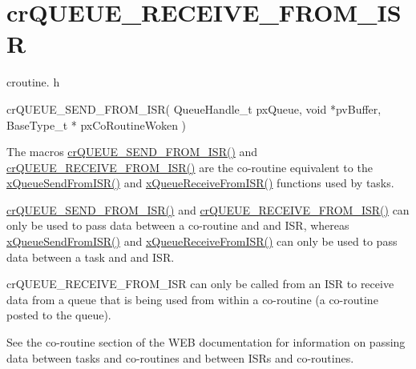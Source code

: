 \hypertarget{group__cr_q_u_e_u_e___r_e_c_e_i_v_e___f_r_o_m___i_s_r}{}\section{cr\+Q\+U\+E\+U\+E\+\_\+\+R\+E\+C\+E\+I\+V\+E\+\_\+\+F\+R\+O\+M\+\_\+\+I\+SR}
\label{group__cr_q_u_e_u_e___r_e_c_e_i_v_e___f_r_o_m___i_s_r}
croutine. h 
\begin{DoxyPre}
 crQUEUE\_SEND\_FROM\_ISR(
                           QueueHandle\_t pxQueue,
                           void *pvBuffer,
                           BaseType\_t * pxCoRoutineWoken
                      )\end{DoxyPre}


The macro\textquotesingle{}s \mbox{\hyperlink{croutine_8h_ac8eb0a81c5cf69de7e4edd73ce44a3be}{cr\+Q\+U\+E\+U\+E\+\_\+\+S\+E\+N\+D\+\_\+\+F\+R\+O\+M\+\_\+\+I\+S\+R()}} and \mbox{\hyperlink{croutine_8h_a9c0fa977ca69adbddb4811affa2a71f7}{cr\+Q\+U\+E\+U\+E\+\_\+\+R\+E\+C\+E\+I\+V\+E\+\_\+\+F\+R\+O\+M\+\_\+\+I\+S\+R()}} are the co-\/routine equivalent to the \mbox{\hyperlink{queue_8h_a21d5919ed26c21d121df4a4debeb643c}{x\+Queue\+Send\+From\+I\+S\+R()}} and \mbox{\hyperlink{queue_8h_acdf528f5c91131ae2f31c669cfd65758}{x\+Queue\+Receive\+From\+I\+S\+R()}} functions used by tasks.

\mbox{\hyperlink{croutine_8h_ac8eb0a81c5cf69de7e4edd73ce44a3be}{cr\+Q\+U\+E\+U\+E\+\_\+\+S\+E\+N\+D\+\_\+\+F\+R\+O\+M\+\_\+\+I\+S\+R()}} and \mbox{\hyperlink{croutine_8h_a9c0fa977ca69adbddb4811affa2a71f7}{cr\+Q\+U\+E\+U\+E\+\_\+\+R\+E\+C\+E\+I\+V\+E\+\_\+\+F\+R\+O\+M\+\_\+\+I\+S\+R()}} can only be used to pass data between a co-\/routine and and I\+SR, whereas \mbox{\hyperlink{queue_8h_a21d5919ed26c21d121df4a4debeb643c}{x\+Queue\+Send\+From\+I\+S\+R()}} and \mbox{\hyperlink{queue_8h_acdf528f5c91131ae2f31c669cfd65758}{x\+Queue\+Receive\+From\+I\+S\+R()}} can only be used to pass data between a task and and I\+SR.

cr\+Q\+U\+E\+U\+E\+\_\+\+R\+E\+C\+E\+I\+V\+E\+\_\+\+F\+R\+O\+M\+\_\+\+I\+SR can only be called from an I\+SR to receive data from a queue that is being used from within a co-\/routine (a co-\/routine posted to the queue).

See the co-\/routine section of the W\+EB documentation for information on passing data between tasks and co-\/routines and between I\+SR\textquotesingle{}s and co-\/routines.


